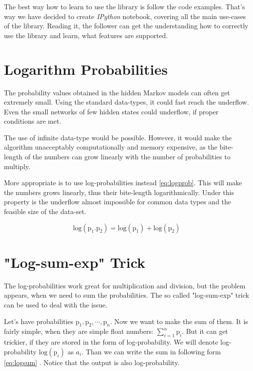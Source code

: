 \documentclass[thesis=M,english]{FITthesis}[2012/10/20]
\begin{document}
The best way how to learn to use the library is follow the code examples. That's way we have decided to create \textit{IPython} notebook, covering all the main use-cases of the library. Reading it, the follower can get the understanding how to correctly use the library and learn, what features are supported.          


\section{Logarithm Probabilities}

The probability values obtained in the hidden Markov models can often get extremely small. Using the standard data-types, it could fast reach the underflow. Even the small networks of few hidden states could underflow, if proper conditions are met. 

The use of infinite data-type would be possible. However, it would make the algorithm unacceptably computationally and memory expensive, as the bite-length of the numbers can grow linearly with the number of probabilities to multiply.

More appropriate is to use log-probabilities instead \eqref{eq:logprob}. This will make the numbers grows linearly, thus their bite-length logarithmically. Under this property is the underflow almost impossible for common data types and the feasible size of the data-set.

\begin{equation}\label{eq:logprob}
\mathrm{log}(\mathrm{p}_1.\mathrm{p}_2) = \mathrm{log}(\mathrm{p}_1) + \mathrm{log}(\mathrm{p}_2)
\end{equation}   

\section{"Log-sum-exp" Trick}

The log-probabilities work great for multiplication and division, but the problem appears, when we need to sum the probabilities. The so called "log-sum-exp" trick can be used to deal with the issue.

Let's have probabilities $ \mathrm{p}_1, \mathrm{p}_2, \cdots ,\mathrm{p}_n $. Now we want to make the sum of them. It is fairly simple, when they are simple float numbers: $\sum_{i=1}^n \mathrm{p}_i$. But it can get trickier, if they are stored in the form of log-probability. We will denote log-probability $\mathrm{log}( \mathrm{p}_i )$ as $a_i$. Than we can write the sum in following form \eqref{eq:logsum} . Notice that the output is also log-probability.
\end{document}
